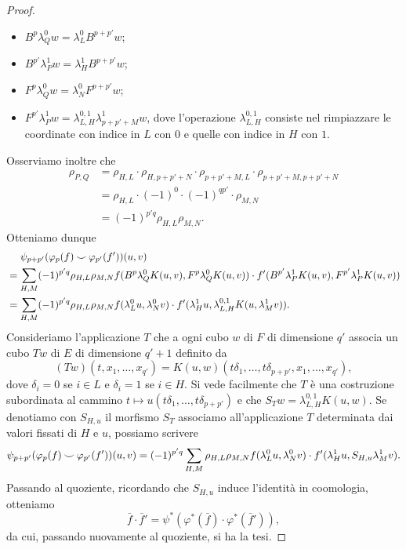 \begin{proof}
\begin{itemize}
\item \(B^p\lambda^0_Qw=\lambda^0_LB^{p+p'}w\);
\item \(B^{p'}\lambda^1_Pw=\lambda^1_HB^{p+p'}w\);
\item \(F^p\lambda^0_Qw=\lambda^0_NF^{p+p'}w\);
\item \(F^{p'}\lambda^1_Pw=\lambda^{0,1}_{L,H}\lambda^1_{p+p'+M}w\), dove l'operazione \(\lambda^{0,1}_{L,H}\) consiste nel rimpiazzare le coordinate con indice in \(L\) con \(0\) e quelle con indice in \(H\) con \(1\).
\end{itemize}
Osserviamo inoltre che
\begin{align*}
\rho_{P,Q}&=\rho_{H,L}\cdot\rho_{H,p+p'+N}\cdot\rho_{p+p'+M,L}\cdot\rho_{p+p'+M,p+p'+N}\\
&=\rho_{H,L}\cdot (-1)^0\cdot(-1)^{qp'}\cdot\rho_{M,N}\\
&=(-1)^{p'q}\rho_{H,L}\rho_{M,N}.
\end{align*}
Otteniamo dunque
\begin{align*}
&\phantomop\psi_{p+p'}(\varphi_p(f)\cupp\varphi_{p'}(f'))(u,v)\\
&=\sum_{H,M}(-1)^{p'q}\rho_{H,L}\rho_{M,N} f(B^p\lambda^0_QK(u,v),F^p\lambda^0_QK(u,v))\cdot f'(B^{p'}\lambda^1_PK(u,v),F^{p'}\lambda^1_PK(u,v))\\
&=\sum_{H,M}(-1)^{p'q}\rho_{H,L}\rho_{M,N}f(\lambda^0_Lu,\lambda^0_Nv)\cdot f'(\lambda^1_Hu,\lambda^{0,1}_{L,H}K(u,\lambda^1_Mv)).
\end{align*}
Consideriamo l'applicazione \(T\) che a ogni cubo \(w\) di \(F\) di dimensione \(q'\) associa un cubo \(Tw\) di \(E\) di dimensione \(q'+1\) definito da
\[
(Tw)(t,x_1,\ldots,x_{q'})=K(u,w)(t\delta_1,\ldots,t\delta_{p+p'},x_1,\ldots,x_{q'}),
\]
dove \(\delta_i=0\) se \(i\in L\) e \(\delta_i=1\) se \(i\in H\). Si vede facilmente che \(T\) è una costruzione subordinata al cammino \(t\mapsto u(t\delta_1,\ldots,t\delta_{p+p'})\) e che \(S_Tw=\lambda^{0,1}_{L,H}K(u,w)\). Se denotiamo con \(S_{H,u}\) il morfismo \(S_T\) associamo all'applicazione \(T\) determinata dai valori fissati di \(H\) e \(u\), possiamo scrivere
\[
\psi_{p+p'}(\varphi_p(f)\mathbin{\smile}\varphi_{p'}(f'))(u,v)=(-1)^{p'q}\sum_{H,M}\rho_{H,L}\rho_{M,N}f(\lambda^0_Lu,\lambda^0_Nv)\cdot f'(\lambda^1_Hu,S_{H,u}\lambda^1_Mv).
\]
Passando al quoziente, ricordando che \(S_{H,u}\) induce l'identità in coomologia, otteniamo
\[
\bar{f}\cdot\bar{f}'=\psi^*(\varphi^*(\bar{f})\cdot\varphi^*(\bar{f}')),
\]
da cui, passando nuovamente al quoziente, si ha la tesi.
\end{proof}

